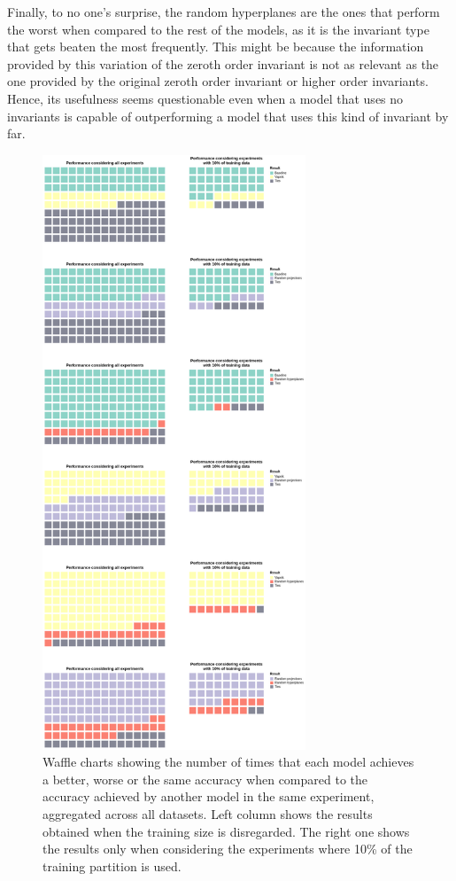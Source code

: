 Finally, to no one's surprise, the random hyperplanes are the ones that perform the worst when compared to the
rest of the models, as it is the invariant type that gets beaten the most frequently. This might be because the
information provided by this variation of the zeroth order invariant is not as relevant as the one provided by
the original zeroth order invariant or higher order invariants. Hence, its usefulness seems questionable even
when a model that uses no invariants is capable of outperforming a model that uses this kind
of invariant by far.

\begin{figure}[ht]
    \centering
    \includegraphics[width=0.7\textwidth]{thesis/Figures/invariants_performance.png}
    \caption{Waffle charts showing the number of times that each model achieves a better, worse or the same
    accuracy when compared to the accuracy achieved by another model in the same experiment, aggregated
    across all datasets. Left column shows the results obtained when the training size is disregarded.
    The right one shows the results only when considering the experiments where 10\% of the training partition
    is used.}
    \label{fig:invariants_performance}
\end{figure}